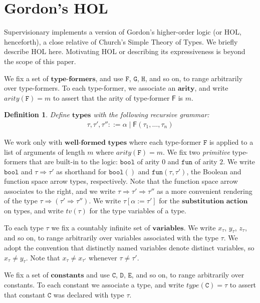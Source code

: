 \documentclass[a4paper, 10pt]{article}
\newtheorem{definition}{Definition}[section]
\newcommand{\deffont}[1]{\ensuremath{\textbf{#1}}}
\begin{document}
\section{Gordon's HOL}
\label{sect.gordons.hol}

Supervisionary implements a version of Gordon's higher-order logic (or HOL, henceforth), a close relative of Church's Simple Theory of Types.
We briefly describe HOL here.
Motivating HOL or describing its expressiveness is beyond the scope of this paper.

We fix a set of \deffont{type-formers}, and use $\mathtt{F}$, $\mathtt{G}$, $\mathtt{H}$, and so on, to range arbitrarily over type-formers.
To each type-former, we associate an \deffont{arity}, and write $arity(\mathtt{F}) = m$ to assert that the arity of type-former $\mathsf{F}$ is $m$.

\begin{definition}
\label{defn.types}
Define \deffont{types} with the following recursive grammar:
\begin{gather*}
\tau, \tau', \tau'' ::= \alpha \mid \mathsf{F}(\tau_1, \ldots, \tau_n)
\end{gather*}
\end{definition}

We work only with \deffont{well-formed types} where each type-former $\mathtt{F}$ is applied to a list of arguments of length $m$ where $arity(\mathtt{F}) = m$.
We fix two \emph{primitive} type-formers that are built-in to the logic: $\mathtt{bool}$ of arity $0$ and $\mathtt{fun}$ of arity $2$.
We write $\mathtt{bool}$ and $\tau \Rightarrow \tau'$ as shorthand for $\mathtt{bool}()$ and $\mathtt{fun}(\tau, \tau')$, the Boolean and function space arrow types, respectively.
Note that the function space arrow associates to the right, and we write $\tau \Rightarrow \tau' \Rightarrow \tau''$ as a more convenient rendering of the type $\tau \Rightarrow (\tau' \Rightarrow \tau'')$.
We write $\tau[\alpha := \tau']$ for the \deffont{substitution action} on types, and write $tv(\tau)$ for the type variables of a type.

To each type $\tau$ we fix a countably infinite set of \deffont{variables}.
We write $x_\tau$, $y_\tau$, $z_\tau$, and so on, to range arbitrarily over variables associated with the type $\tau$.
We adopt the convention that distinctly named variables denote distinct variables, so $x_\tau \neq y_\tau$.
Note that $x_\tau \neq x_{\tau'}$ whenever $\tau \neq \tau'$.

We fix a set of \deffont{constants} and use $\mathtt{C}$, $\mathtt{D}$, $\mathtt{E}$, and so on, to range arbitrarily over constants.
To each constant we associate a type, and write $type(\mathtt{C}) = \tau$ to assert that constant $\mathtt{C}$ was declared with type $\tau$.
\end{document}
